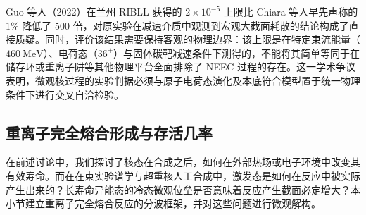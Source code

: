 Guo 等人（2022）在兰州 RIBLL 获得的 $2 \times 10^{-5}$ 上限比 Chiara 等人早先声称的 $1\%$ 降低了 500 倍，对原实验在减速介质中观测到宏观大截面耗散的结论构成了直接质疑。同时，评价该结果需要保持客观的物理边界：该上限是在特定束流能量（$460\ \mathrm{MeV}$）、电荷态（$36^+$）与固体碳靶减速条件下测得的，不能将其简单等同于在储存环或重离子阱等其他物理平台全面排除了 NEEC 过程的存在。这一学术争议表明，微观核过程的实验判据必须与原子电荷态演化及本底符合模型置于统一物理条件下进行交叉自洽检验。

\subsection{重离子完全熔合形成与存活几率}\label{sec:4-8-3}

在前述讨论中，我们探讨了核态在合成之后，如何在外部热场或电子环境中改变其有效寿命。而在在束实验谱学与超重核人工合成中，激发态是如何在反应中被实际产生出来的？长寿命异能态的冷态微观位垒是否意味着反应产生截面必定增大？本小节建立重离子完全熔合反应的分波框架，并对这些问题进行微观解构。

